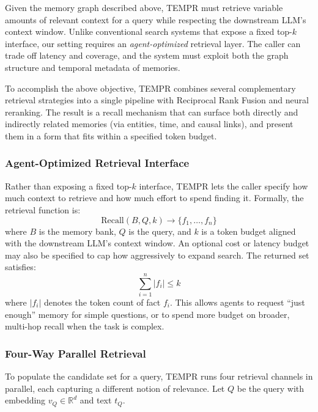 Given the memory graph described above, TEMPR must retrieve variable amounts of relevant context for a query while respecting the downstream LLM's context window. Unlike conventional search systems that expose a fixed top-$k$ interface, our setting requires an \emph{agent-optimized} retrieval layer. The caller can trade off latency and coverage, and the system must exploit both the graph structure and temporal metadata of memories.

To accomplish the above objective, TEMPR combines several complementary retrieval strategies into a single pipeline with Reciprocal Rank Fusion and neural reranking. The result is a recall mechanism that can surface both directly and indirectly related memories (via entities, time, and causal links), and present them in a form that fits within a specified token budget.

\subsubsection{Agent-Optimized Retrieval Interface}

Rather than exposing a fixed top-$k$ interface, TEMPR lets the caller specify how much context to retrieve and how much effort to spend finding it. Formally, the retrieval function is:
\begin{equation}
\text{Recall}(B, Q, k) \rightarrow \{f_1, \ldots, f_n\}
\end{equation}
where $B$ is the memory bank, $Q$ is the query, and $k$ is a token budget aligned with the downstream LLM's context window. An optional cost or latency budget may also be specified to cap how aggressively to expand search. The returned set satisfies:
\begin{equation}
\sum_{i=1}^n |f_i| \leq k
\end{equation}
where $|f_i|$ denotes the token count of fact $f_i$. This allows agents to request ``just enough'' memory for simple questions, or to spend more budget on broader, multi-hop recall when the task is complex.

\subsubsection{Four-Way Parallel Retrieval}

To populate the candidate set for a query, TEMPR runs four retrieval channels in parallel, each capturing a different notion of relevance. Let $Q$ be the query with embedding $v_Q \in \mathbb{R}^d$ and text $t_Q$.

